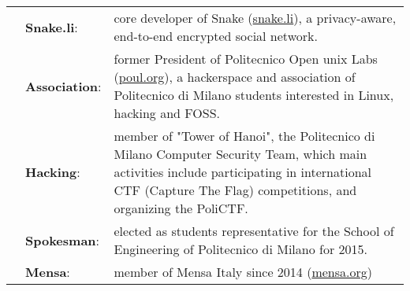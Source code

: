 \documentclass[a4paper,10pt]{article}
\begin{document}
\noindent
\large
\begin{tabularx}{\textwidth}{ C{0.5cm} L{3.1cm} *{1}{X}}
	& \textbf{Snake.li}: & core developer of Snake (\href{https://snake.li}{snake.li}), a privacy-aware, end-to-end encrypted social network. \vspace{2 mm}\\
	& \textbf{Association}: & former President of Politecnico Open unix Labs (\href{https://poul.org}{poul.org}), a hackerspace and association of Politecnico di Milano students interested in Linux, hacking and FOSS. \vspace{2 mm}\\
	& \textbf{Hacking}: & member of "Tower of Hanoi", the Politecnico di Milano Computer Security Team, which main activities include participating in international CTF (Capture The Flag) competitions, and organizing the PoliCTF. \vspace{2 mm}\\
	& \textbf{Spokesman}: & elected as students representative for the School of Engineering of Politecnico di Milano for 2015. \vspace{2 mm}\\
	& \textbf{Mensa}: & member of Mensa Italy since 2014 (\href{https://mensa.org}{mensa.org}) \vspace{2 mm}\\
\end{tabularx}
\end{document}
